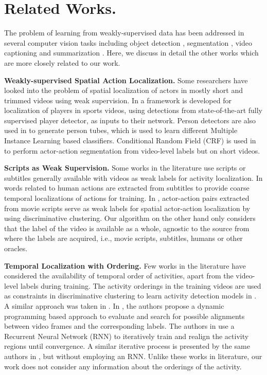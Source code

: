 \documentclass[runningheads]{llncs}
\begin{document}
\section{Related Works.}
The problem of learning from weakly-supervised data has been addressed in several computer vision tasks including object detection \cite{bilen2016weakly,durand2016weldon,li2016weakly,shi2017transfer,cinbis2017weakly,singh2017hide}, segmentation \cite{vezhnevets2010towards,pathak2015constrained,bearman2016s,khoreva2017simple,wei2017stc}, video captioning \cite{shen2017weakly} and summarization \cite{panda2017weakly}. Here, we discuss in detail the other works which are more closely related to our work.

\textbf{Weakly-supervised Spatial Action Localization.} Some researchers have looked into the problem of spatial localization of actors in mostly short and trimmed videos using weak supervision. In \cite{chen2017attending} a framework is developed for localization of players in sports videos, using detections from state-of-the-art fully supervised player detector, as inputs to their network. Person detectors are also used in \cite{siva2011weakly,weinzaepfel2016towards} to generate person tubes, which is used to learn different Multiple Instance Learning based classifiers. Conditional Random Field (CRF) is used in \cite{yan2017weakly} to perform actor-action segmentation from video-level labels but on short videos. 

\textbf{Scripts as Weak Supervision.} Some works in the literature use scripts or subtitles generally available with videos as weak labels for activity localization. In \cite{laptev2008learning,duchenne2009automatic} words related to human actions are extracted from subtitles to provide coarse temporal localizations of actions for training. In \cite{bojanowski2013finding}, actor-action pairs extracted from movie scripts serve as weak labels for spatial actor-action localization by using discriminative clustering. Our algorithm on the other hand only considers that the label of the video is available as a whole, agnostic to the source from where the labels are acquired, i.e., movie scripts, subtitles, humans or other oracles.

\textbf{Temporal Localization with Ordering.} Few works in the literature have considered the availability of temporal order of activities, apart from the video-level labels during training. The activity orderings in the training videos are used as constraints in discriminative clustering to learn activity detection models in \cite{bojanowski2014weakly}. A similar approach was taken in \cite{bojanowski2015weakly}. In \cite{huang2016connectionist}, the authors propose a dynamic programming based approach to evaluate and search for possible alignments between video frames and the corresponding labels. The authors in \cite{richard2017weakly} use a Recurrent Neural Network (RNN) to iteratively train and realign the activity regions until convergence. A similar iterative process is presented by the same authors in \cite{kuehne2017weakly}, but without employing an RNN. Unlike these works in literature, our work does not consider any information about the orderings of the activity.
\end{document}

